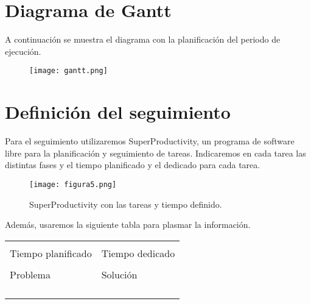 \section{Diagrama de Gantt}
A continuación se muestra el diagrama con la planificación del periodo de ejecución.

\begin{figure}[H]
  \centering
  \texttt{[image: gantt.png]}
  \label{fig:gantt}
\end{figure}
%

\section{Definición del seguimiento}

Para el seguimiento utilizaremos SuperProductivity, un programa de software libre para la planificación y seguimiento de tareas. Indicaremos en cada tarea las distintas fases y el tiempo planificado y el dedicado para cada tarea. 

\begin{figure}[H]
  \centering
  \texttt{[image: figura5.png]}
  \label{fig:superproductivity}
  \caption{SuperProductivity con las tareas y tiempo definido.}
\end{figure}

Además, usaremos la siguiente tabla para plasmar la información.
\begin{table}[h!]
    \centering
\begin{tabularx}{\textwidth}{|>{\centering\arraybackslash}X|>{\centering\arraybackslash}X|}
\hline
\multicolumn{2}{|>{\columncolor[gray]{.8}}c|}{Tarea} \\ \hline
\multicolumn{2}{|c|}{  } \\ \hline
\rowcolor[gray]{.8} Tiempo planificado & Tiempo dedicado\\ \hline
& \\ \hline
\rowcolor[gray]{.8} Problema & Solución\\ \hline
& \\ \hline
& \\ \hline
\multicolumn{2}{|>{\columncolor[gray]{.8}}c|}{Actividad} \\ \hline
\multicolumn{2}{|c|}{ } \\ \hline
    \end{tabularx}
    \label{tab:tarea_ejemplo}
\end{table}

